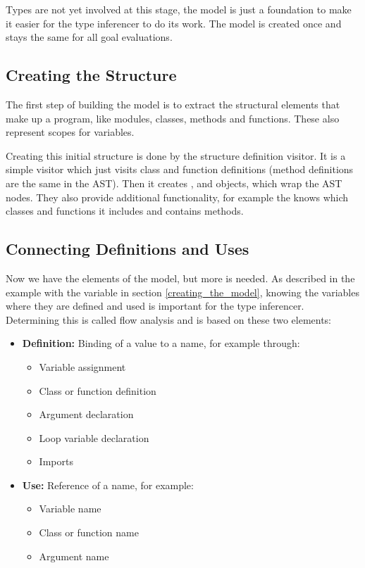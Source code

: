 \documentclass[12pt,halfparskip,DIV11,BCOR10mm]{scrreprt}
\begin{document}
Types are not yet involved at this stage, the model is just a foundation to make it easier for the type inferencer to do its work. The model is created once and stays the same for all goal evaluations.

\subsection{Creating the Structure}

The first step of building the model is to extract the structural elements that make up a program, like modules, classes, methods and functions. These also represent scopes for variables.

Creating this initial structure is done by the structure definition visitor. It is a simple visitor which just visits class and function definitions (method definitions are the same in the AST). Then it creates ,  and  objects, which wrap the AST nodes. They also provide additional functionality, for example the  knows which classes and functions it includes and  contains methods.

\subsection{Connecting Definitions and Uses}

Now we have the elements of the model, but more is needed. As described in the example with the  variable in section \vref{creating_the_model}, knowing the variables where they are defined and used is important for the type inferencer. Determining this is called flow analysis and is based on these two elements:

\begin{itemize}
    \item \textbf{Definition:} Binding of a value to a name, for example through:
    \begin{itemize}
        \item Variable assignment
        \item Class or function definition
        \item Argument declaration
        \item Loop variable declaration
        \item Imports
    \end{itemize}
    \item \textbf{Use:} Reference of a name, for example:
    \begin{itemize}
        \item Variable name
        \item Class or function name
        \item Argument name
    \end{itemize}
\end{itemize}
\end{document}

